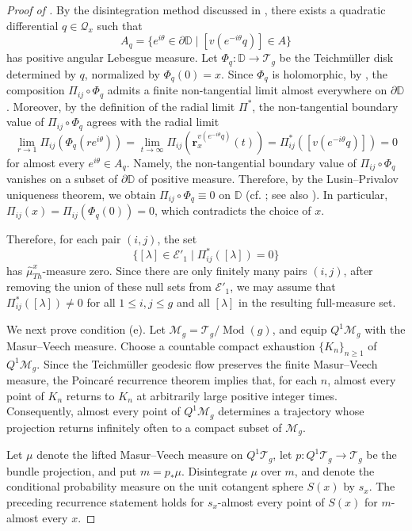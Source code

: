 \documentclass[dvipdfmx]{amsart}
\theoremstyle{remark}
\newcommand{\teich}{\mathcal{T}}
\newcommand{\tmod}{\operatorname{Mod}}
\newcommand{\PThursM}{\hat{\mu}_{Th}}
\newcommand{\ray}{{\boldsymbol r}}
\begin{document}
\begin{proof}[Proof of ]
By the disintegration method discussed in \cite[\S3.1, \S4]{Miyachi2024Bounded}, there exists a quadratic differential $q\in \mathcal{Q}_x$ such that
\[
A_q=\{e^{i\theta}\in \partial \mathbb{D}\mid [v(e^{-i\theta}q)]\in A\}
\]
has positive angular Lebesgue measure.
Let $\Phi_q\colon \mathbb{D}\to \teich_{g}$ be the Teichm\"uller disk determined by $q$, normalized by $\Phi_q(0)=x$.
Since $\Phi_q$ is holomorphic, by \cite[\S5, Lemma]{Shiga1984}, the composition $\Pi_{ij}\circ \Phi_q$ admits a finite non-tangential limit almost everywhere on $\partial\mathbb{D}$.
Moreover, by the definition of the radial limit $\Pi^*$, the non-tangential boundary value of $\Pi_{ij}\circ \Phi_q$ agrees with
the radial limit
\[
\lim_{r\to 1}\Pi_{ij}(\Phi_q(re^{i\theta}))
=\lim_{t\to\infty}\Pi_{ij}(\ray^{v(e^{-i\theta}q)}_x(t))
=\Pi_{ij}^*([v(e^{-i\theta}q)])=0
\]
for almost every $e^{i\theta}\in A_q$.
Namely, the non-tangential boundary value of $\Pi_{ij}\circ \Phi_q$ vanishes on a subset of $\partial\mathbb{D}$ of positive measure.
Therefore, by the Lusin--Privalov uniqueness theorem, we obtain
$\Pi_{ij}\circ \Phi_q\equiv 0$ on $\mathbb{D}$
(cf. \cite{LusinPriwaloff1925}; see also \cite{Tsuji1944}).
In particular, $\Pi_{ij}(x)=\Pi_{ij}(\Phi_q(0))=0$, which contradicts the choice of $x$.

Therefore, for each pair $(i,j)$, the set
\[
\{[\lambda]\in \mathcal{E}'_1\mid \Pi^*_{ij}([\lambda])=0\}
\]
has $\PThursM^x$-measure zero.
Since there are only finitely many pairs $(i,j)$, after removing the union of these null sets from $\mathcal{E}'_1$, we may assume that
$\Pi^*_{ij}([\lambda])\ne 0$ for all $1\le i,j\le g$ and all $[\lambda]$ in the resulting full-measure set.

We next prove condition (e).
Let $\mathcal M_g=\teich_g/\tmod(g)$, and equip
$Q^1\mathcal M_g$ with the Masur--Veech measure.
Choose a countable compact exhaustion
$\{K_n\}_{n\ge1}$ of $Q^1\mathcal M_g$.
Since the Teichm\"uller geodesic flow preserves
the finite Masur--Veech measure, the Poincar\'e
recurrence theorem implies that, for each $n$,
almost every point of $K_n$ returns to $K_n$
at arbitrarily large positive integer times.
Consequently, almost every point of
$Q^1\mathcal M_g$ determines a trajectory whose
projection returns infinitely often to a compact
subset of $\mathcal M_g$.

Let $\mu$ denote the lifted Masur--Veech measure
on $Q^1\teich_g$, let
$p\colon Q^1\teich_g\to\teich_g$ be the bundle
projection, and put $m=p_*\mu$.
Disintegrate $\mu$ over $m$, and denote the
conditional probability measure on the unit
cotangent sphere $S(x)$ by $s_x$.
The preceding recurrence statement holds for
$s_x$-almost every point of $S(x)$ for
$m$-almost every $x$.


\end{proof}
\end{document}
